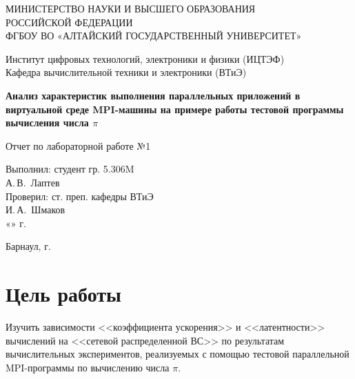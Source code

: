 \documentclass{altsu-bachelor}
\begin{document}
\begin{titlepage}
 \begin{center}
    \normalsize
    МИНИСТЕРСТВО НАУКИ И ВЫСШЕГО ОБРАЗОВАНИЯ \\
    РОССИЙСКОЙ ФЕДЕРАЦИИ \\
    ФГБОУ ВО «АЛТАЙСКИЙ ГОСУДАРСТВЕННЫЙ УНИВЕРСИТЕТ»
    \vfill
     
    Институт цифровых технологий, электроники и физики (ИЦТЭФ) \\
    Кафедра вычислительной техники и электроники (ВТиЭ)
    \vfill
     
    \textbf{Анализ характеристик выполнения параллельных приложений в виртуальной среде MPI-машины на примере работы тестовой программы вычисления числа $\pi$}
    
    Отчет по лабораторной работе №1
 \end{center}
\vfill
 
\newlength{\ML}
\hfill\begin{minipage}{0.41\textwidth}
  Выполнил: студент гр. 5.306M\\
  \underline{\hspace{\ML}} А.\,В.~Лаптев \\
  Проверил: ст. преп. кафедры ВТиЭ\\
  \underline{\hspace{\ML}} И.\,А.~Шмаков \\
  «\underline{\hspace{1cm}}» \underline{\hspace{3cm}} \the\year г.
\end{minipage}%
\vfill
 
\begin{center}
  Барнаул, \the\year г.
\end{center}
\end{titlepage}

\setcounter{page}{2}
\tableofcontents
\newpage

\section*{Цель работы}

Изучить зависимости <<коэффициента ускорения>> и <<латентности>> вычислений на <<сетевой распределенной ВС>> по результатам вычислительных экспериментов, реализуемых с помощью тестовой параллельной MPI-программы по вычислению числа $\pi$.
\end{document}
